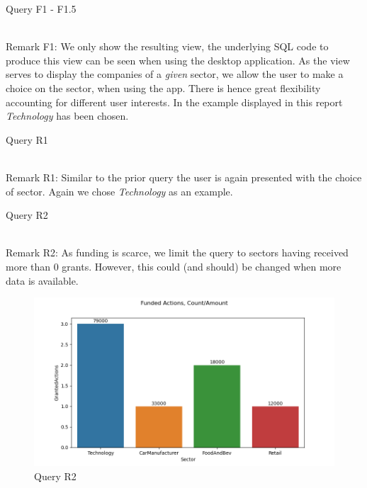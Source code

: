 \begin{table}[!htb]
    \caption{Query F1 - F1.5}
     \\
    Remark F1: We only show the resulting view, the underlying SQL code to produce this view can be seen when using  the
    desktop application.
    As the view serves to display the companies of a \textit{given} sector, we allow the user to make a choice on the
sector, when using the app.
There is hence great flexibility accounting for different user interests.
In the example displayed in this report \textit{Technology} has been chosen.
\end{table}



\begin{table}[!htb]
    \caption{Query R1}
     \\
    Remark R1: Similar to the prior query the user is again presented with the choice of sector.
Again we chose \textit{Technology} as an example.
\end{table}



\begin{table}[!htb]
    \caption{Query R2}
     \\
    Remark R2: As funding is scarce, we limit the query to sectors having received more than 0 grants.
However, this could (and should) be changed when more data is available.
\end{table}

\begin{figure}[h!]
    \centering
    \caption{Query R2}
    \label{fig:R2}
    \includegraphics[width=16cm]{R2_plot.png}
\end{figure}



